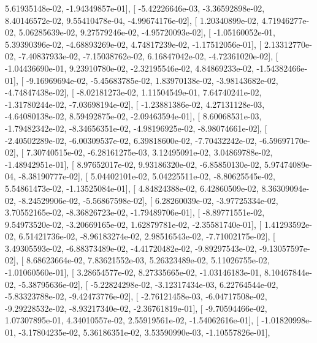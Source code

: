 \documentclass{article}
\begin{document}
          5.61935148e-02,  -1.94349857e-01],
       [ -5.42226646e-03,  -3.36592898e-02,   8.40146572e-02,
          9.55410478e-04,  -4.99674176e-02],
       [  1.20340899e-02,   4.71946277e-02,   5.06285639e-02,
          9.27579246e-02,  -4.95720093e-02],
       [ -1.05160052e-01,   5.39390396e-02,  -4.68893269e-02,
          4.74817239e-02,  -1.17512056e-01],
       [  2.13312770e-02,  -7.40837933e-02,  -7.15038762e-02,
          6.16847042e-02,  -4.72361020e-02],
       [ -1.04436690e-01,   9.23910780e-02,  -2.32195546e-02,
          4.84869233e-02,  -1.54382466e-01],
       [ -9.16969694e-02,  -5.45683785e-02,   1.83970138e-02,
         -3.98143682e-02,  -4.74847438e-02],
       [ -8.02181273e-02,   1.11504549e-01,   7.64740241e-02,
         -1.31780244e-02,  -7.03698194e-02],
       [ -1.23881386e-02,   4.27131128e-03,  -4.64080138e-02,
          8.59492875e-02,  -2.09463594e-01],
       [  8.60068531e-03,  -1.79482342e-02,  -8.34656351e-02,
         -4.98196925e-02,  -8.98074661e-02],
       [ -2.40502289e-02,  -6.00309537e-02,   6.39818600e-02,
         -7.70432242e-02,  -6.59697170e-02],
       [  7.30740515e-02,  -6.28161275e-03,   3.12495091e-02,
          3.04869788e-02,  -1.48942951e-01],
       [  8.97652017e-02,   9.93186320e-02,  -6.85850130e-02,
          5.97474089e-04,  -8.38190777e-02],
       [  5.04402101e-02,   5.04225511e-02,  -8.80625545e-02,
          5.54861473e-02,  -1.13525084e-01],
       [  4.84824388e-02,   6.42860509e-02,   8.36309094e-02,
         -8.24529906e-02,  -5.56867598e-02],
       [  6.28260039e-02,  -3.97725334e-02,   3.70552165e-02,
         -8.36826723e-02,  -1.79489706e-01],
       [ -8.89771551e-02,   9.54973520e-02,  -3.20669165e-02,
          1.62879781e-02,  -2.35581740e-01],
       [  1.41293592e-02,   6.51421736e-02,  -8.96183274e-02,
          2.98516543e-02,  -7.71002175e-02],
       [  3.49305593e-02,  -6.88373489e-02,  -4.41720482e-02,
         -9.89297543e-02,  -9.13057597e-02],
       [  8.68623664e-02,   7.83621552e-03,   5.26323489e-02,
          5.11026755e-02,  -1.01060560e-01],
       [  3.28654577e-02,   8.27335665e-02,  -1.03146183e-01,
          8.10467844e-02,  -5.38795636e-02],
       [ -5.22824298e-02,  -3.12317434e-03,   6.22764544e-02,
         -5.83323788e-02,  -9.42473776e-02],
       [ -2.76121458e-03,  -6.04717508e-02,  -9.29228532e-02,
         -8.93217340e-02,  -2.36761819e-01],
       [ -9.70594466e-02,   1.07307895e-01,   4.34010557e-02,
          2.55919561e-02,  -1.54062616e-01],
       [ -1.01820998e-01,  -3.17804235e-02,   5.36186351e-02,
          3.53590990e-03,  -1.10557826e-01],
\end{document}
